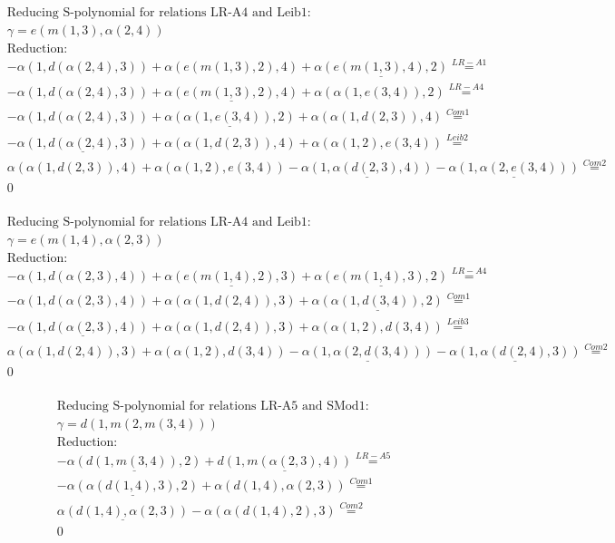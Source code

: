 \documentclass[11pt]{amsart}
\begin{document}
\begin{align*} 
& \text{Reducing S-polynomial for relations LR-A4 and Leib1:} \\ 
& \gamma = e(m(1,3),\alpha(2,4)) \\ 
& \text{Reduction}: \\& - \alpha(1,d(\alpha(2,4),3)) + \alpha(e(m(1,3),2),4) + \underline{\alpha(e(m(1,3),4),2)} \stackrel{ LR-A1 }{=}  \\ 
& - \alpha(1,d(\alpha(2,4),3)) + \underline{\alpha(e(m(1,3),2),4)} + \alpha(\alpha(1,e(3,4)),2) \stackrel{ LR-A4 }{=}  \\ 
& - \alpha(1,d(\alpha(2,4),3)) + \underline{\alpha(\alpha(1,e(3,4)),2)} + \alpha(\alpha(1,d(2,3)),4) \stackrel{ Com1 }{=}  \\ 
& - \underline{\alpha(1,d(\alpha(2,4),3))} + \alpha(\alpha(1,d(2,3)),4) + \alpha(\alpha(1,2),e(3,4)) \stackrel{ Leib2 }{=}  \\ 
&\alpha(\alpha(1,d(2,3)),4) + \alpha(\alpha(1,2),e(3,4)) - \underline{\alpha(1,\alpha(d(2,3),4))} - \underline{\alpha(1,\alpha(2,e(3,4)))} \stackrel{ Com2 }{=}  \\ 
&0\\ 
\end{align*} 
 
\begin{align*} 
& \text{Reducing S-polynomial for relations LR-A4 and Leib1:} \\ 
& \gamma = e(m(1,4),\alpha(2,3)) \\ 
& \text{Reduction}: \\& - \alpha(1,d(\alpha(2,3),4)) + \underline{\alpha(e(m(1,4),2),3)} + \underline{\alpha(e(m(1,4),3),2)} \stackrel{ LR-A4 }{=}  \\ 
& - \alpha(1,d(\alpha(2,3),4)) + \alpha(\alpha(1,d(2,4)),3) + \underline{\alpha(\alpha(1,d(3,4)),2)} \stackrel{ Com1 }{=}  \\ 
& - \underline{\alpha(1,d(\alpha(2,3),4))} + \alpha(\alpha(1,d(2,4)),3) + \alpha(\alpha(1,2),d(3,4)) \stackrel{ Leib3 }{=}  \\ 
&\alpha(\alpha(1,d(2,4)),3) + \alpha(\alpha(1,2),d(3,4)) - \underline{\alpha(1,\alpha(2,d(3,4)))} - \underline{\alpha(1,\alpha(d(2,4),3))} \stackrel{ Com2 }{=}  \\ 
&0\\ 
\end{align*} 
 
\begin{align*} 
& \text{Reducing S-polynomial for relations LR-A5 and SMod1:} \\ 
& \gamma = d(1,m(2,m(3,4))) \\ 
& \text{Reduction}: \\& - \underline{\alpha(d(1,m(3,4)),2)} + \underline{d(1,m(\alpha(2,3),4))} \stackrel{ LR-A5 }{=}  \\ 
& - \underline{\alpha(\alpha(d(1,4),3),2)} + \alpha(d(1,4),\alpha(2,3)) \stackrel{ Com1 }{=}  \\ 
&\underline{\alpha(d(1,4),\alpha(2,3))} - \alpha(\alpha(d(1,4),2),3) \stackrel{ Com2 }{=}  \\ 
&0\\ 
\end{align*} 
 
\end{document}
